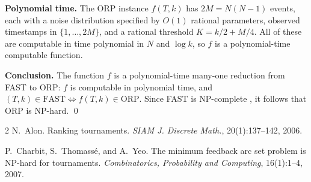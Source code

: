\documentclass[11pt]{article}
\begin{document}
\smallskip
\noindent\textbf{Polynomial time.} The ORP instance $f(T, k)$ has $2M = N(N-1)$ events, each with a noise distribution specified by $O(1)$ rational parameters, observed timestamps in $\{1, \ldots, 2M\}$, and a rational threshold $K = k/2 + M/4$. All of these are computable in time polynomial in $N$ and $\log k$, so $f$ is a polynomial-time computable function.

\smallskip
\noindent\textbf{Conclusion.} The function $f$ is a polynomial-time many-one reduction from FAST to ORP: $f$ is computable in polynomial time, and $(T, k) \in \mathrm{FAST} \iff f(T, k) \in \mathrm{ORP}$. Since FAST is NP-complete \cite{alon2006,charbit2007}, it follows that ORP is NP-hard. \qed

\begin{thebibliography}{2}
N.~Alon.
\newblock Ranking tournaments.
\newblock \textit{SIAM J. Discrete Math.}, 20(1):137--142, 2006.

P.~Charbit, S.~Thomass\'{e}, and A.~Yeo.
\newblock The minimum feedback arc set problem is NP-hard for tournaments.
\newblock \textit{Combinatorics, Probability and Computing}, 16(1):1--4, 2007.
\end{thebibliography}
\end{document}
